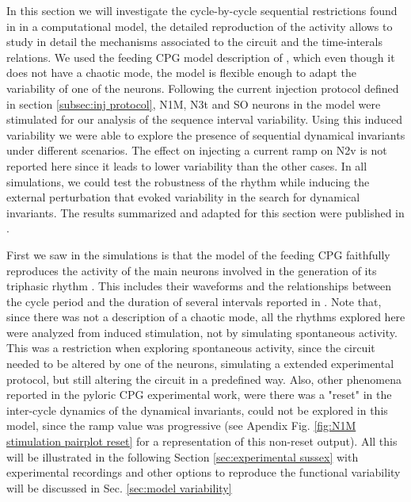 In this section we will investigate the cycle-by-cycle sequential restrictions found in \cite{elices_robust_2019} in a computational model, the detailed reproduction of the activity allows to study in detail the mechanisms associated to the circuit and the time-interals relations. We used the feeding CPG model description of \cite{vavoulis_dynamic_2007}, which even though it does not have a chaotic mode, the model is flexible enough to adapt the variability of one of the neurons. Following the current injection protocol defined in section \ref{subsec:inj protocol}, N1M, N3t and SO neurons in the model were stimulated for our analysis of the sequence interval variability. Using this induced variability we were able to explore the presence of sequential dynamical invariants under different scenarios. The effect on injecting a current ramp on N2v is not reported here since it leads to lower variability than the other cases. In all simulations, we could test the robustness of the rhythm while inducing the external perturbation that evoked variability in the search for dynamical invariants. The results summarized and adapted for this section were published in \cite{garrido-pena_characterization_2021}.

First we saw in the simulations is that the model of the feeding CPG faithfully reproduces the activity of the main neurons involved in the generation of its triphasic rhythm \parencite{Vavoulis2007}. This includes their waveforms and the relationships between the cycle period and the duration of several intervals reported in \parencite{Elliott1991}. Note that, since there was not a description of a chaotic mode, all the rhythms explored here were analyzed from induced stimulation, not by simulating spontaneous activity. This was a restriction when exploring spontaneous activity, since the circuit needed to be altered by one of the neurons, simulating a extended experimental protocol, but still altering the circuit in a predefined way. Also, other phenomena reported in the pyloric CPG experimental work, were there was a "reset" in the inter-cycle dynamics of the dynamical invariants, could not be explored in this model, since the ramp value was progressive (see Apendix Fig. \ref{fig:N1M stimulation pairplot reset} for a representation of this non-reset output). All this will be illustrated in the following Section \ref{sec:experimental sussex} with experimental recordings and other options to reproduce the functional variability will be discussed in Sec. \ref{sec:model variability}

